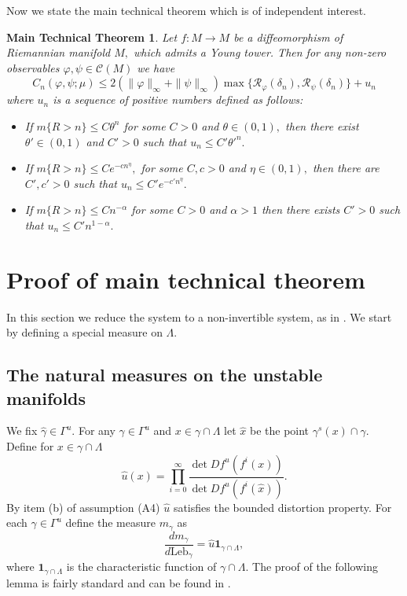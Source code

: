 \documentclass[a4paper,12pt]{amsart}
\numberwithin{equation}{section}
\newtheorem*{mtthm}{Main Technical Theorem}
\begin{document}
Now we state the main technical theorem which is of independent
interest.

\begin{mtthm} Let $f:M\to M$ be a
diffeomorphism of Riemannian manifold $M,$ which admits a Young
tower. Then for any non-zero observables $\varphi,\psi\in\mathcal
C(M)$ we have
\begin{equation} \label{corrl}
C_n(\varphi, \psi; \mu)\le
2(\|\varphi\|_\infty+\|\psi\|_\infty)\max\{\mathcal
R_\varphi(\delta_n), \mathcal R_\psi(\delta_n)\}+u_n\end{equation}
 where $u_n$ is
a  sequence  of positive numbers defined as follows:
\begin{itemize}
\item[(i)] If $m\{R>n\}\le C\theta^n$ for some  $C>0$ and
$\theta\in(0, 1),$  then there exist $\theta'\in (0, 1)$ and $C'>0$
such that $u_n\le C'{\theta'}^n.$
\item[(ii)] If $m\{R>n\}\le C e^{-cn^\eta},$ for some $C,c>0$ and
$\eta\in (0, 1),$ then there are $C',c'>0$ such that $u_n\le
C'e^{-c'n^\eta}.$
\item[(iii)] If $m\{R>n\}\le Cn^{-\alpha}$ for some
$C>0$ and $\alpha>1$  then  there exists $C'>0$ such that $u_n\le
C'n^{1-\alpha}.$
\end{itemize}
\end{mtthm}

\section{Proof of  main technical theorem}
In this section we reduce the system to a non-invertible system, as
in \cite{Y1}. We start by defining a special measure on $\Lambda.$

\subsection{The natural measures on the  unstable manifolds}
We fix  $\hat\gamma\in\Gamma^u.$ For any $\gamma\in\Gamma^u$ and
$x\in\gamma\cap\Lambda$ let $\hat x$ be the point
$\gamma^s(x)\cap\gamma.$ Define for $x\in\gamma\cap\Lambda$
$$
\hat u(x)=\prod_{i=0}^{\infty}\frac{\det Df^u(f^i(x))}{\det
Df^u(f^i(\hat x))}.
$$
By item (b) of assumption (A4) $\hat u$ satisfies the bounded
distortion property. For each $\gamma\in\Gamma^u$ define the measure
$m_\gamma$ as
$$
\frac{dm_\gamma}{d\text{Leb}_\gamma}=\hat
u\mathbf{1}_{\gamma\cap\Lambda},
$$
where $\mathbf{1}_{\gamma\cap\Lambda}$ is the characteristic
function of $\gamma\cap\Lambda.$ The proof of the following lemma is
fairly standard and can be found in \cite{AlvPin}.
\end{document}
